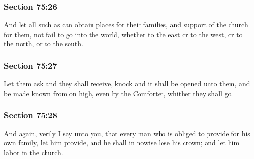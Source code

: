 	\subsubsection{Section 75:26} %
		\label{DC75-26}

		And let all such as can obtain places for their families, and support of the church for them, not fail to go into the world, whether to the east or to the west, or to the north, or to the south.


	\subsubsection{Section 75:27} %
		\label{DC75-27}

		Let them ask and they shall receive, knock and it shall be opened unto them, and be made known from on high, even by the \hyperref[COMFORTER]{Comforter}, whither they shall go.


	\subsubsection{Section 75:28} %
		\label{DC75-28}

		And again, verily I say unto you, that every man who is obliged to provide for his own family, let him provide, and he shall in nowise lose his crown; and let him labor in the church.


